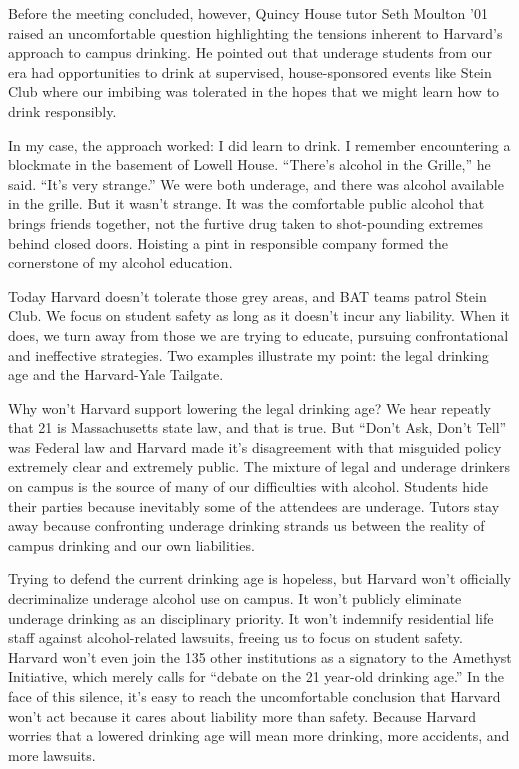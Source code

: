 Before the meeting concluded, however, Quincy House tutor Seth Moulton '01
raised an uncomfortable question highlighting the tensions inherent to
Harvard's approach to campus drinking. He pointed out that underage students
from our era had opportunities to drink at supervised, house-sponsored events
like Stein Club where our imbibing was tolerated in the hopes that we might
learn how to drink responsibly.

In my case, the approach worked: I did learn to drink. I remember
encountering a blockmate in the basement of Lowell House. ``There's alcohol
in the Grille,'' he said. ``It's very strange.'' We were both underage, and
there was alcohol available in the grille. But it wasn't strange. It was the
comfortable public alcohol that brings friends together, not the furtive drug
taken to shot-pounding extremes behind closed doors. Hoisting a pint in
responsible company formed the cornerstone of my alcohol education.

Today Harvard doesn't tolerate those grey areas, and BAT teams patrol Stein
Club. We focus on student safety as long as it doesn't incur any liability.
When it does, we turn away from those we are trying to educate, pursuing
confrontational and ineffective strategies. Two examples illustrate my point:
the legal drinking age and the Harvard-Yale Tailgate.

Why won't Harvard support lowering the legal drinking age? We hear repeatly
that 21 is Massachusetts state law, and that is true. But ``Don't Ask, Don't
Tell'' was Federal law and Harvard made it's disagreement with that misguided
policy extremely clear and extremely public. The mixture of legal and
underage drinkers on campus is the source of many of our difficulties with
alcohol. Students hide their parties because inevitably some of the attendees
are underage. Tutors stay away because confronting underage drinking strands
us between the reality of campus drinking and our own liabilities.

Trying to defend the current drinking age is hopeless, but Harvard won't
officially decriminalize underage alcohol use on campus. It won't publicly
eliminate underage drinking as an disciplinary priority. It won't indemnify
residential life staff against alcohol-related lawsuits, freeing us to focus
on student safety. Harvard won't even join the 135 other institutions as a
signatory to the Amethyst Initiative, which merely calls for ``debate on the
21 year-old drinking age.'' In the face of this silence, it's easy to reach
the uncomfortable conclusion that Harvard won't act because it cares about
liability more than safety. Because Harvard worries that a lowered drinking
age will mean more drinking, more accidents, and more lawsuits.

